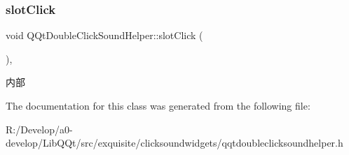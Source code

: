 \subsubsection{\texorpdfstring{slot\+Click}{slotClick}}
{\footnotesize\ttfamily void Q\+Qt\+Double\+Click\+Sound\+Helper\+::slot\+Click (\begin{DoxyParamCaption}{ }\end{DoxyParamCaption})\hspace{0.3cm}{\ttfamily [inline]}, {\ttfamily [slot]}}

内部 

The documentation for this class was generated from the following file\+:\begin{DoxyCompactItemize}
\item 
R\+:/\+Develop/a0-\/develop/\+Lib\+Q\+Qt/src/exquisite/clicksoundwidgets/qqtdoubleclicksoundhelper.\+h\end{DoxyCompactItemize}
